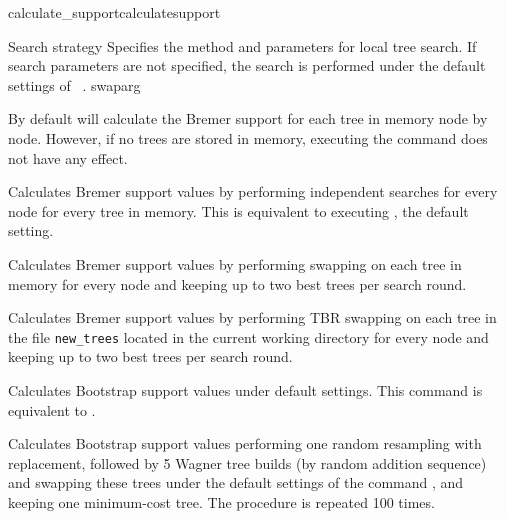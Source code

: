 \begin{command}{calculate\_support}{calculatesupport}
\begin{arguments}
\begin{argumentgroup}{Search strategy}
            {Specifies the method and parameters for local tree search. If search
            parameters are not specified, the search is performed under
            the default settings of ~.} 
            {swaparg}
	     
        	\end{argumentgroup}

	\end{arguments}

    {By default \poy will calculate the Bremer support for each tree in memory node by node.
    However, if no trees are stored in memory, executing the command
     does not have any effect.}
    
     	\begin{poyexamples} 

            {Calculates Bremer support values by performing
            independent searches for every node for every tree in memory. 
            This is equivalent to executing , the default setting.}
         
            {Calculates Bremer support values by performing swapping on 
            each tree in memory for every node and keeping up to two
            best trees per search round.}
          
            {Calculates Bremer support values by performing TBR swapping on 
            each tree in the file \texttt{new\_trees} located in the current
            working directory for every node and keeping up to two
            best trees per search round.}  
            
         {Calculates Bootstrap support values under default settings. This command
         is equivalent to .}
	
            {Calculates Bootstrap support values performing one random resampling with
            replacement, followed by 5 Wagner tree builds (by random addition sequence)
            and swapping these trees under the default settings of the command 
            , and keeping one minimum-cost tree. The procedure
            is repeated 100 times.}
        

\end{poyexamples}
\end{command}
